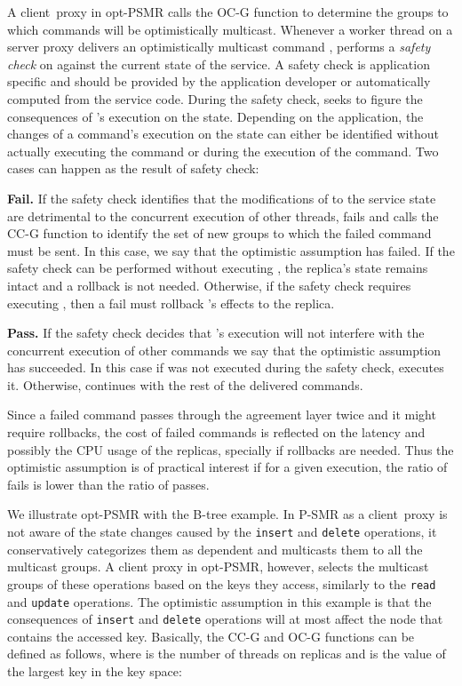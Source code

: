 \documentclass[conference]{IEEEtran}
\begin{document}
A client~proxy in opt-PSMR calls the OC-G function to determine the groups to which commands will be optimistically multicast. 
Whenever a worker thread  on a server proxy  delivers an optimistically multicast command ,  performs a \emph{safety check} on  against the current state of the service. 
A safety check is application specific and should be provided by the application developer or automatically computed from the service code. 
During the safety check,  seeks to figure the consequences of 's execution on the state. 
Depending on the application, the changes of a command's execution on the state can either be identified without actually executing the command or during the execution of the command. 
Two cases can happen as the result of safety check:



\noindent \textbf{Fail.} If the safety check identifies that the modifications of  to the service state are detrimental to the concurrent execution of other threads,  fails  and calls the CC-G function to identify the set of new groups to which the failed command must be sent. 
In this case, we say that the optimistic assumption has failed. 
If the safety check can be performed without executing , the replica's state remains intact and a rollback is not needed. Otherwise, if the safety check requires executing , then a fail must rollback 's effects to the replica. 


\noindent \textbf{Pass.} If the safety check decides that 's execution will not interfere with the concurrent execution of other commands we say that the optimistic assumption has succeeded. In this case if  was not executed during the safety check,  executes it. Otherwise,  continues with the rest of the delivered commands.

Since a failed command passes through the agreement layer twice and it might require rollbacks, the cost of failed commands is reflected on the latency and possibly the CPU usage of the replicas, specially if rollbacks are needed. 
Thus the optimistic assumption is of practical interest if for a given execution, the ratio of fails is lower than the ratio of passes.




We illustrate opt-PSMR with the B-tree example. In P-SMR as a client~proxy is not aware of the state changes caused by the \texttt{insert} and \texttt{delete} operations, it conservatively categorizes them as dependent and multicasts them to all the multicast groups. A client proxy in opt-PSMR, however, selects the multicast groups of these operations based on the keys they access, similarly to the \texttt{read} and \texttt{update} operations. The optimistic assumption in this example is that the consequences of \texttt{insert} and \texttt{delete} operations will at most affect the node that contains the accessed key. Basically, the CC-G and OC-G functions can be defined as follows, where  is the number of threads on replicas and  is the value of the largest key in the key space:
\end{document}
